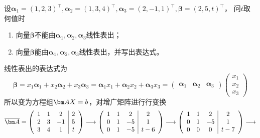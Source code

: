 \begin{example}
    设$\bm{\alpha}_1 = (1,2,3)^\intercal,\bm{\alpha}_2 = (1,3,4)^\intercal, \bm{\alpha}_3 = (2,-1,1)^\intercal,\bm{\beta} = (2,5,t)^\intercal$，
    问$t$取何值时
    \begin{enumerate}[(1)]
        \item 向量$\bm{\beta}$不能由$\bm{\alpha}_1,\bm{\alpha}_2,\bm{\alpha}_3$线性表出；
        \item 向量$\bm{\beta}$能由$\bm{\alpha}_1,\bm{\alpha}_2,\bm{\alpha}_3$线性表出，并写出表达式。
    \end{enumerate}
\end{example}
\begin{solution}
    线性表出的表达式为
    \[
        \bm{\beta} = x_1\bm{\alpha}_1 + x_2 \bm{\alpha}_2 + x_3\bm{\alpha}_3
        = \bm{\alpha}_1x_1 + \bm{\alpha}_2x_2 + \bm{\alpha}_3x_3
        =
        \begin{pmatrix}
            \bm{\alpha}_1 & \bm{\alpha}_2 & \bm{\alpha}_3
        \end{pmatrix}
        \begin{pmatrix}
            x_1 \\x_2\\x_3
        \end{pmatrix}
    \]
    所以变为方程组$\mat{AX}=b$，对增广矩阵进行行变换
    \[
        \overline{\mat{A}}=
        \left(\begin{array}{ccc|c}
                1 & 1 & 2  & 2 \\
                2 & 3 & -1 & 5 \\
                3 & 4 & 1  & t \\
            \end{array}\right)
        \longrightarrow
        \left(\begin{array}{ccc|c}
                1 & 1 & 2  & 2   \\
                0 & 1 & -5 & 1   \\
                0 & 1 & -5 & t-6 \\
            \end{array}\right)
        \longrightarrow
        \left(\begin{array}{ccc|c}
                1 & 1 & 2  & 2   \\
                0 & 1 & -5 & 1   \\
                0 & 0 & 0  & t-7 \\
            \end{array}\right)
        \longrightarrow
\]
\end{solution}
